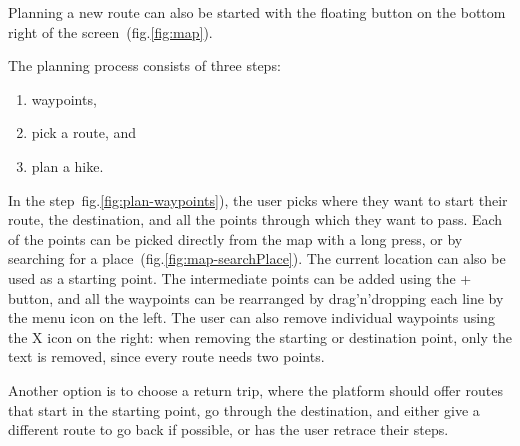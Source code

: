 Planning a new route can also be started with the floating button on the bottom right of the screen~(fig.\ref{fig:map}).

The planning process consists of three steps:
\begin{enumerate}
    \item waypoints,
    \item pick a route, and
    \item plan a hike.
\end{enumerate}

In the  step~fig.\ref{fig:plan-waypoints}), the user picks where they want to start their route, the destination, and all the points through which they want to pass.
Each of the points can be picked directly from the map with a long press, or by searching for a place~(fig.\ref{fig:map-searchPlace}).
The current location can also be used as a starting point.
The intermediate points can be added using the + button, and all the waypoints can be rearranged by drag'n'dropping each line by the menu icon on the left.
The user can also remove individual waypoints using the X icon on the right: when removing the starting or destination point, only the text is removed, since every route needs two points.

Another option is to choose a return trip, where the platform should offer routes that start in the starting point, go through the destination, and either give a different route to go back if possible, or has the user retrace their steps.

